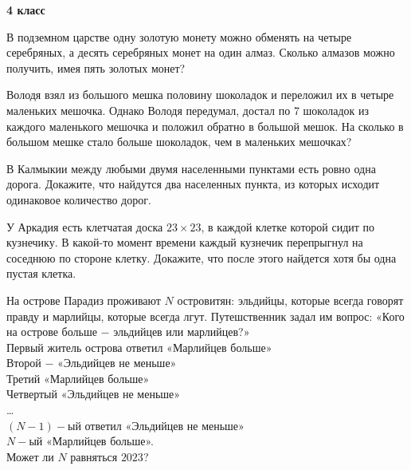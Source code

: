 \centerline{\bf \Huge 4 класс}
 В подземном царстве одну золотую монету можно обменять на четыре серебряных, а десять серебряных монет на один алмаз. Сколько алмазов можно получить, имея пять золотых монет?

 Володя взял из большого мешка половину шоколадок и переложил их в четыре маленьких мешочка. Однако Володя передумал, достал по 7 шоколадок из каждого маленького мешочка и положил обратно в большой мешок. На сколько в большом мешке стало больше шоколадок, чем в маленьких мешочках? 

 В Калмыкии между любыми двумя населенными пунктами есть ровно одна дорога. Докажите, что найдутся два населенных пункта, из которых исходит одинаковое количество дорог.

 У Аркадия есть клетчатая доска $23\times23$, в каждой клетке которой сидит по кузнечику. В какой-то момент времени каждый кузнечик перепрыгнул на соседнюю по стороне клетку. Докажите, что после этого найдется хотя бы одна пустая клетка. 

 На острове Парадиз проживают $N$ островитян: эльдийцы, которые всегда говорят правду и марлийцы, которые всегда лгут. Путешственник задал им вопрос: «Кого на острове больше $-$ эльдийцев или марлийцев?» \\
Первый житель острова ответил «Марлийцев больше» \\ 
Второй $-$ «Эльдийцев не меньше» \\
Третий «Марлийцев больше» \\
Четвертый «Эльдийцев не меньше» \\
… \\
$(N-1)-$ый ответил «Эльдийцев не меньше» \\
$N-$ый «Марлийцев больше». \\
Может ли $N$ равняться $2023$?

